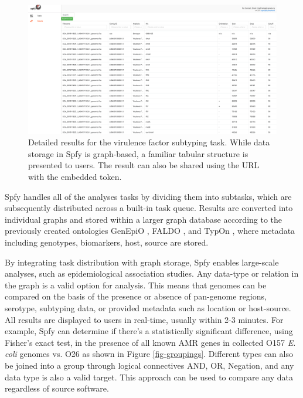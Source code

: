 \documentclass{article}
\begin{document}
\begin{figure}[!htb]
\begin{center}{}
\includegraphics[width=\textwidth]{images/tables.png}
\end{center}
\caption{Detailed results for the virulence factor subtyping task. While data storage in Spfy is graph-based, a familiar tabular structure is presented to users. The result can also be shared using the URL with the embedded token.}
\label{fig-tables}
\end{figure}

Spfy handles all of the analyses tasks by dividing them into subtasks, which are subsequently distributed across a built-in task queue. Results are converted into individual graphs and stored within a larger graph database according to the previously created ontologies GenEpiO \cite{griffiths2017context}, FALDO \cite{bolleman2016faldo}, and TypOn \cite{vaz2014typon}, where metadata including genotypes, biomarkers, host, source are stored.

By integrating task distribution with graph storage, Spfy enables large-scale analyses, such as epidemiological association studies. Any data-type or relation in the graph is a valid option for analysis. This means that genomes can be compared on the basis of the presence or absence of pan-genome regions, serotype, subtyping data, or provided metadata such as location or host-source. All results are displayed to users in real-time, usually within 2-3 minutes.
For example, Spfy can determine if there's a statistically significant difference, using Fisher's exact test, in the presence of all known AMR genes in collected O157 \textit{E. coli} genomes vs. O26 as shown in Figure \ref{fig-groupings}.
Different types can also be joined into a group through logical connectives AND, OR, Negation, and any data type is also a valid target. This approach can be used to compare any data regardless of source software.
\end{document}
